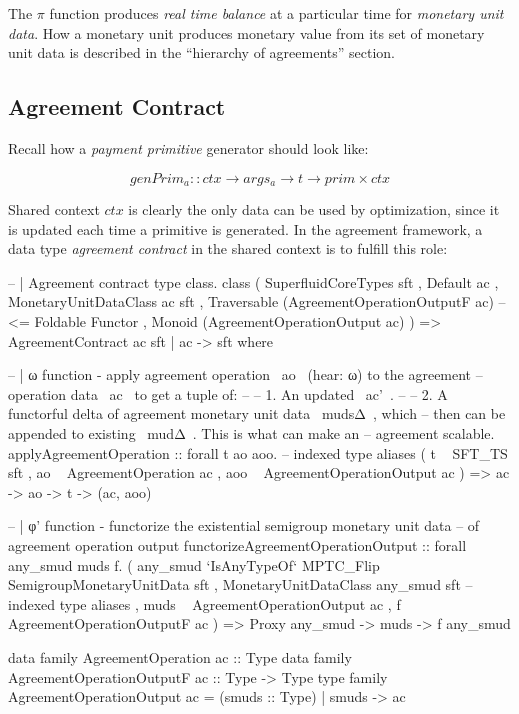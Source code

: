 The $\pi$ function produces \textit{real time balance} at a particular time for \textit{monetary
unit data}. How a monetary unit produces monetary value from its set of monetary unit data is
described in the ``hierarchy of agreements'' section.

\subsection{Agreement Contract}

Recall how a \textit{payment primitive} generator should look like:

\begin{equation}
    genPrim_a :: ctx \rightarrow args_a \rightarrow t \rightarrow prim \times ctx
\end{equation}

Shared context $ctx$ is clearly the only data can be used by optimization, since it is updated each
time a primitive is generated. In the agreement framework, a data type \textit{agreement contract}
in the shared context is to fulfill this role:

\begin{code}
-- | Agreement contract type class.
class ( SuperfluidCoreTypes sft
      , Default ac
      , MonetaryUnitDataClass ac sft
      , Traversable (AgreementOperationOutputF ac) -- <= Foldable Functor
      , Monoid (AgreementOperationOutput ac)
      ) => AgreementContract ac sft | ac -> sft where

    -- | ω function - apply agreement operation ~ao~ (hear: ω) to the agreement
    --                operation data ~ac~ to get a tuple of:
    --
    --   1. An updated ~ac'~.
    --
    --   2. A functorful delta of agreement monetary unit data ~mudsΔ~, which
    --      then can be appended to existing ~mudΔ~.  This is what can make an
    --      agreement scalable.
    applyAgreementOperation
        :: forall t ao aoo.
           -- indexed type aliases
           ( t ~ SFT_TS sft
           , ao ~ AgreementOperation ac
           , aoo ~ AgreementOperationOutput ac
           )
        => ac -> ao -> t -> (ac, aoo)

    -- | φ' function - functorize the existential semigroup monetary unit data
    --                 of agreement operation output
    functorizeAgreementOperationOutput
        :: forall any_smud muds f.
           ( any_smud `IsAnyTypeOf` MPTC_Flip SemigroupMonetaryUnitData sft
           , MonetaryUnitDataClass any_smud sft
           -- indexed type aliases
           , muds ~ AgreementOperationOutput ac
           , f ~ AgreementOperationOutputF ac
           )
        => Proxy any_smud
        -> muds -> f any_smud

    data family AgreementOperation ac :: Type
    data family AgreementOperationOutputF ac :: Type -> Type
    type family AgreementOperationOutput ac = (smuds :: Type) | smuds -> ac
\end{code}

